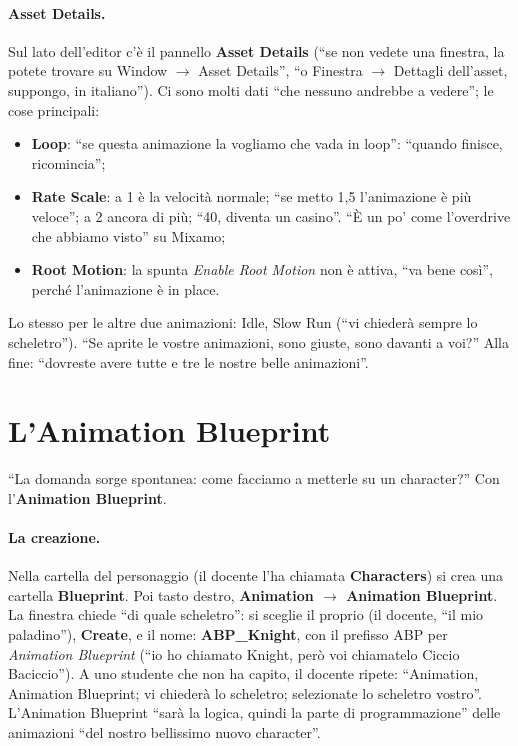 \paragraph{Asset Details.} Sul lato dell'editor c'è il pannello \textbf{Asset Details}
(``se non vedete una finestra, la potete trovare su Window $\rightarrow$ Asset Details'',
``o Finestra $\rightarrow$ Dettagli dell'asset, suppongo, in italiano''). Ci sono molti
dati ``che nessuno andrebbe a vedere''; le cose principali:
\begin{itemize}
  \item \textbf{Loop}: ``se questa animazione la vogliamo che vada in loop'': ``quando
        finisce, ricomincia'';
  \item \textbf{Rate Scale}: a 1 è la velocità normale; ``se metto 1,5 l'animazione è
        più veloce''; a 2 ancora di più; ``40, diventa un casino''. ``È un po' come
        l'overdrive che abbiamo visto'' su Mixamo;
  \item \textbf{Root Motion}: la spunta \emph{Enable Root Motion} non è attiva, ``va
        bene così'', perché l'animazione è in place.
\end{itemize}
Lo stesso per le altre due animazioni: Idle, Slow Run (``vi chiederà sempre lo
scheletro''). ``Se aprite le vostre animazioni, sono giuste, sono davanti a voi?'' Alla
fine: ``dovreste avere tutte e tre le nostre belle animazioni''.

\section{L'Animation Blueprint}
\label{ue8:sec:abp}

``La domanda sorge spontanea: come facciamo a metterle su un character?'' Con
l'\textbf{Animation Blueprint}.

\paragraph{La creazione.} Nella cartella del personaggio (il docente l'ha chiamata
\textbf{Characters}) si crea una cartella \textbf{Blueprint}. Poi tasto destro,
\textbf{Animation $\rightarrow$ Animation Blueprint}. La finestra chiede ``di quale
scheletro'': si sceglie il proprio (il docente, ``il mio paladino''), \textbf{Create}, e il
nome: \textbf{ABP\_Knight}, con il prefisso ABP per \emph{Animation Blueprint} (``io ho
chiamato Knight, però voi chiamatelo Ciccio Baciccio''). A uno studente che non ha
capito, il docente ripete: ``Animation, Animation Blueprint; vi chiederà lo scheletro;
selezionate lo scheletro vostro''. L'Animation Blueprint ``sarà la logica, quindi la
parte di programmazione'' delle animazioni ``del nostro bellissimo nuovo character''.

